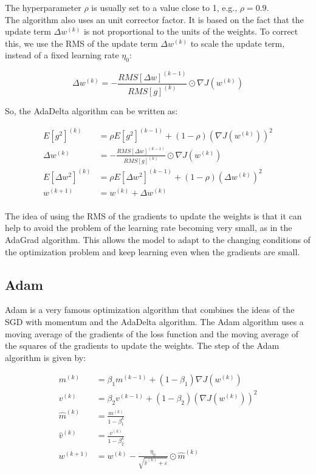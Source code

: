 The hyperparameter $\rho$ is usually set to a value close to 1, e.g., $\rho = 0.9$. \\

The algorithm also uses an unit corrector factor. It is based on the fact that the update term $\Delta w^{(k)}$
is not proportional to the units of the weights. To correct this, we use the RMS of the update term
$\Delta w^{(k)}$ to scale the update term, instead of a fixed learning rate $\eta_0$:

\begin{equation}
    \Delta w^{(k)} = - \frac{RMS[\Delta w]^{(k-1)}}{RMS[g]^{(k)}} \odot \nabla J(w^{(k)})
\end{equation}

So, the AdaDelta algorithm can be written as:

\begin{equation}
    \begin{aligned}
        E[g^2]^{(k)} &= \rho E[g^2]^{(k-1)} + (1 - \rho) (\nabla J(w^{(k)}))^2 \\
        \Delta w^{(k)} &= - \frac{RMS[\Delta w]^{(k-1)}}{RMS[g]^{(k)}} \odot \nabla J(w^{(k)})\\
        E[\Delta w^2]^{(k)} &= \rho E[\Delta w^2]^{(k-1)} + (1 - \rho) (\Delta w^{(k)})^2\\
        w^{(k+1)} &= w^{(k)} + \Delta w^{(k)}\\
    \end{aligned}
\end{equation}

The idea of using the RMS of the gradients to update the weights is that it can help to avoid the
problem of the learning rate becoming very small, as in the AdaGrad algorithm. This allows the model
to adapt to the changing conditions of the optimization problem and keep learning even when the
gradients are small.

\subsection{Adam}

Adam is a very famous optimization algorithm that combines the ideas of the SGD with momentum and
the AdaDelta algorithm. The Adam algorithm uses a moving average of the gradients of the loss function
and the moving average of the squares of the gradients to update the weights. The step of the Adam
algorithm is given by:

\begin{equation}
    \begin{aligned}
        m^{(k)} &= \beta_1 m^{(k-1)} + (1 - \beta_1) \nabla J(w^{(k)}) \\
        v^{(k)} &= \beta_2 v^{(k-1)} + (1 - \beta_2) (\nabla J(w^{(k)}))^2 \\
        \hat{m}^{(k)} &= \frac{m^{(k)}}{1 - \beta_1^k} \\
        \hat{v}^{(k)} &= \frac{v^{(k)}}{1 - \beta_2^k} \\
        w^{(k+1)} &= w^{(k)} -  \frac{\eta_0}{\sqrt{\hat{v}^{(k)} + \varepsilon}} \odot \hat{m}^{(k)}
    \end{aligned}
\end{equation}

